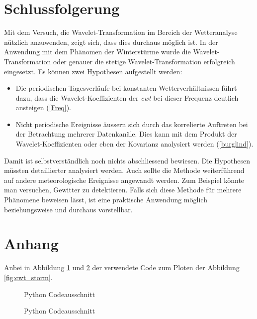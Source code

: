 \begin{refsection}
\section{Schlussfolgerung}

Mit dem Versuch, die Wavelet-Transformation im Bereich der Wetteranalyse nützlich anzuwenden, zeigt sich, dass dies durchaus möglich ist.
In der Anwendung mit dem Phänomen der Winterstürme wurde die Wavelet-Transformation oder genauer die stetige Wavelet-Transformation erfolgreich eingesetzt.
Es können zwei Hypothesen aufgestellt werden:
\begin{itemize}
	\item Die periodischen Tagesverläufe bei konstanten Wetterverhältnissen führt dazu, dass die Wavelet-Koeffizienten der \textit{cwt} bei dieser Frequenz deutlich ansteigen (\ref{Freq}).
	
	\item Nicht periodische Ereignisse äussern sich durch das korrelierte Auftreten bei der Betrachtung mehrerer Datenkanäle. Dies kann mit dem Produkt der Wavelet-Koeffizienten oder eben der Kovarianz analysiert werden (\ref{burglind}).
\end{itemize}


Damit ist selbstverständlich noch nichts abschliessend bewiesen. Die Hypothesen müssten detaillierter analysiert werden.
Auch sollte die Methode weiterführend auf andere meteorologische Ereignisse angewandt werden.
Zum Beispiel könnte man versuchen, Gewitter zu detektieren.
Falls sich diese Methode für mehrere Phänomene beweisen lässt, ist eine praktische Anwendung möglich beziehungsweise und durchaus vorstellbar. 

\section{Anhang}
Anbei in Abbildung \ref{fig:python-plot-code} und \ref{fig:python-plot-code2} der verwendete Code zum Ploten der Abbildung \ref{fig:cwt_storm}.

\begin{figure}[h]
	\centering
	
	\caption{Python Codeausschnitt}
	\label{fig:python-plot-code}
\end{figure}
\begin{figure}[h]
	\centering
	
	\caption{Python Codeausschnitt}
	\label{fig:python-plot-code2}
\end{figure}
 

\printbibliography[heading=subbibliography]
\end{refsection}
